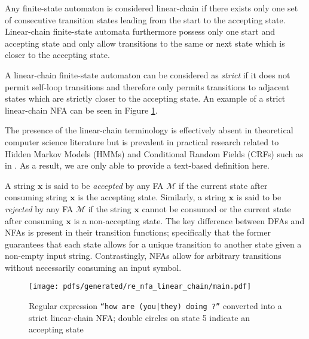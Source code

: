 \begin{definition}
  \label{def:lfa}
  Any finite-state automaton is considered linear-chain if there exists only one
  set of consecutive transition states leading from the start to the accepting
  state. Linear-chain finite-state automata furthermore possess only one start
  and accepting state and only allow transitions to the same or next state which is
  closer to the accepting state.

  \begin{remark}
    \label{rmk:strict_linear_chain}
    A linear-chain finite-state automaton can be considered as \textit{strict}
    if it does not permit self-loop transitions and therefore only permits
    transitions to adjacent states which are strictly closer to the
    accepting state. An example of a strict linear-chain NFA can be seen in
    Figure \ref{fig:regex_fa}.
  \end{remark}

  \begin{remark}
    The presence of the linear-chain terminology is effectively absent in
    theoretical computer science literature but is prevalent in practical
    research related to Hidden Markov Models (HMMs) and Conditional Random
    Fields (CRFs) such as in \citet{tsuruoka2009fast}. As a result, we are only
    able to provide a text-based definition here.
  \end{remark}
  
\end{definition}

A string $\bm{x}$ is said to be \textit{accepted} by any FA $\mathcal{M}$ if the
current state after consuming string $\bm{x}$ is the accepting state. Similarly,
a string $\bm{x}$ is said to be \textit{rejected} by any FA $\mathcal{M}$ if the
string $\bm{x}$ cannot be consumed or the current state after consuming $\bm{x}$
is a non-accepting state. The key difference between DFAs and NFAs is present in
their transition functions; specifically that the former guarantees that each
state allows for a unique transition to another state given a non-empty input
string. Contrastingly, NFAs allow for arbitrary transitions without necessarily
consuming an input symbol.

\begin{figure}[t]
  \centering
  \texttt{[image: pdfs/generated/re\_nfa\_linear\_chain/main.pdf]}
  \caption{Regular expression \texttt{``how are (you|they) doing ?''} converted
    into a strict linear-chain NFA; double circles on state 5 indicate an
    accepting state}
  \label{fig:regex_fa}
\end{figure}

